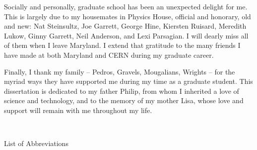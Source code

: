 \documentclass[12pt]{thesis}  %
\renewcommand{\baselinestretch}{2}
\begin{document}
Socially and personally, graduate school has been an unexpected delight for me. This is largely due to my housemates in Physics House, official and honorary, old and new: Nat Steinsultz, Joe Garrett, George Hine, Kiersten Ruisard, Meredith Lukow, Ginny Garrett, Neil Anderson, and Lexi Parsagian. I will dearly miss all of them when I leave Maryland. I extend that gratitude to the many friends I have made at both Maryland and CERN during my graduate career.

Finally, I thank my family -- Pedros, Gravels, Mougalians, Wrights -- for the myriad ways they have supported me during my time as a graduate student. This dissertation is dedicated to my father Philip, from whom I inherited a love of science and technology, and to the memory of my mother Lisa, whose love and support will remain with me throughout my life. 
\renewcommand{\baselinestretch}{1}
\normalsize
{}
{}
\protect\tableofcontents %
\newpage
\protect\listoftables %
\newpage
\protect\listoffigures %
\newpage

{}

\renewcommand{\baselinestretch}{1}
\small\normalsize
\hbox{\ }

\vspace{-4em}

\begin{center}
\large{List of Abbreviations}
\end{center} 

\vspace{3pt}
\end{document}
